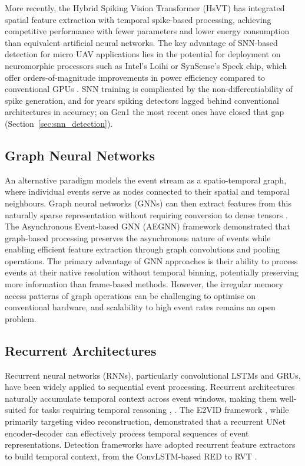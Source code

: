 \documentclass[11pt, a4paper]{report}
\begin{document}
More recently, the Hybrid Spiking Vision Transformer (HsVT) \cite{xu2025hybrid} has integrated spatial feature extraction with temporal spike-based processing, achieving competitive performance with fewer parameters and lower energy consumption than equivalent artificial neural networks. The key advantage of SNN-based detection for micro UAV applications lies in the potential for deployment on neuromorphic processors such as Intel's Loihi or SynSense's Speck chip, which offer orders-of-magnitude improvements in power efficiency compared to conventional GPUs \cite{synsense2026speck}. SNN training is complicated by the non-differentiability of spike generation, and for years spiking detectors lagged behind conventional architectures in accuracy; on Gen1 the most recent ones have closed that gap (Section~\ref{sec:snn_detection}). 

\subsection{Graph Neural Networks}
An alternative paradigm models the event stream as a spatio-temporal graph, where individual events serve as nodes connected to their spatial and temporal neighbours. Graph neural networks (GNNs) can then extract features from this naturally sparse representation without requiring conversion to dense tensors \cite{bi2019graph}. The Asynchronous Event-based GNN (AEGNN) framework \cite{schaefer2022aegnn} demonstrated that graph-based processing preserves the asynchronous nature of events while enabling efficient feature extraction through graph convolutions and pooling operations. The primary advantage of GNN approaches is their ability to process events at their native resolution without temporal binning, potentially preserving more information than frame-based methods. However, the irregular memory access patterns of graph operations can be challenging to optimise on conventional hardware, and scalability to high event rates remains an open problem. 

\subsection{Recurrent Architectures}
Recurrent neural networks (RNNs), particularly convolutional LSTMs and GRUs, have been widely applied to sequential event processing. Recurrent architectures naturally accumulate temporal context across event windows, making them well-suited for tasks requiring temporal reasoning \cite{rebecq2019e2vid}, \cite{cannici2019attention}. The E2VID framework \cite{rebecq2019e2vid}, while primarily targeting video reconstruction, demonstrated that a recurrent UNet encoder-decoder can effectively process temporal sequences of event representations. Detection frameworks have adopted recurrent feature extractors to build temporal context, from the ConvLSTM-based RED \cite{perot2020learning} to RVT \cite{gehrig2023recurrent}. 
\end{document}
